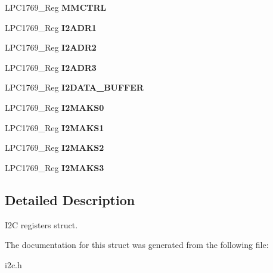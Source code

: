 \begin{DoxyCompactItemize}
\item 
\hypertarget{struct_l_p_c1769___i2_c_a2fac4c30ef00e973af59ed4fffcd353f}{L\+P\+C1769\+\_\+\+Reg {\bfseries M\+M\+C\+T\+R\+L}}\label{struct_l_p_c1769___i2_c_a2fac4c30ef00e973af59ed4fffcd353f}

\item 
\hypertarget{struct_l_p_c1769___i2_c_a5914249049ea4cdc414dd36f933cbcaf}{L\+P\+C1769\+\_\+\+Reg {\bfseries I2\+A\+D\+R1}}\label{struct_l_p_c1769___i2_c_a5914249049ea4cdc414dd36f933cbcaf}

\item 
\hypertarget{struct_l_p_c1769___i2_c_a0bee1daf745a6bacbde8d25c48bfd5db}{L\+P\+C1769\+\_\+\+Reg {\bfseries I2\+A\+D\+R2}}\label{struct_l_p_c1769___i2_c_a0bee1daf745a6bacbde8d25c48bfd5db}

\item 
\hypertarget{struct_l_p_c1769___i2_c_a4e0ae880d972b303fe06a3538f83a4b6}{L\+P\+C1769\+\_\+\+Reg {\bfseries I2\+A\+D\+R3}}\label{struct_l_p_c1769___i2_c_a4e0ae880d972b303fe06a3538f83a4b6}

\item 
\hypertarget{struct_l_p_c1769___i2_c_a72e821346cd7941a1ff7f6c269a5ea02}{L\+P\+C1769\+\_\+\+Reg {\bfseries I2\+D\+A\+T\+A\+\_\+\+B\+U\+F\+F\+E\+R}}\label{struct_l_p_c1769___i2_c_a72e821346cd7941a1ff7f6c269a5ea02}

\item 
\hypertarget{struct_l_p_c1769___i2_c_adb07be9380cd2bd4b51036781c5a50ce}{L\+P\+C1769\+\_\+\+Reg {\bfseries I2\+M\+A\+K\+S0}}\label{struct_l_p_c1769___i2_c_adb07be9380cd2bd4b51036781c5a50ce}

\item 
\hypertarget{struct_l_p_c1769___i2_c_a704cad41251f9f695fbbcb7bbe4675c5}{L\+P\+C1769\+\_\+\+Reg {\bfseries I2\+M\+A\+K\+S1}}\label{struct_l_p_c1769___i2_c_a704cad41251f9f695fbbcb7bbe4675c5}

\item 
\hypertarget{struct_l_p_c1769___i2_c_ac0e9dfa2d3da2f4ef8cb84a9121bf220}{L\+P\+C1769\+\_\+\+Reg {\bfseries I2\+M\+A\+K\+S2}}\label{struct_l_p_c1769___i2_c_ac0e9dfa2d3da2f4ef8cb84a9121bf220}

\item 
\hypertarget{struct_l_p_c1769___i2_c_a24b66fb7a6365af27bd09331afa7ac56}{L\+P\+C1769\+\_\+\+Reg {\bfseries I2\+M\+A\+K\+S3}}\label{struct_l_p_c1769___i2_c_a24b66fb7a6365af27bd09331afa7ac56}

\end{DoxyCompactItemize}


\subsection{Detailed Description}
I2\+C registers struct. 

The documentation for this struct was generated from the following file\+:\begin{DoxyCompactItemize}
\item 
i2c.\+h\end{DoxyCompactItemize}
